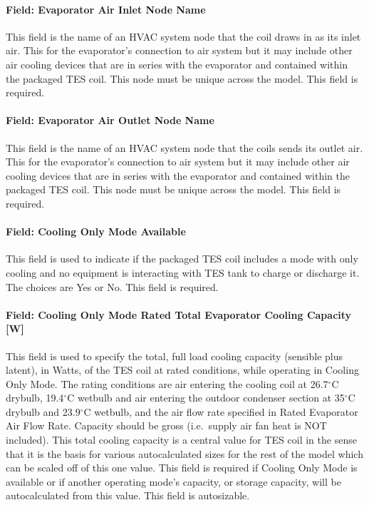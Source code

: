 \paragraph{Field: Evaporator Air Inlet Node Name}\label{field-evaporator-air-inlet-node-name-3}

This field is the name of an HVAC system node that the coil draws in as its inlet air. This for the evaporator's connection to air system but it may include other air cooling devices that are in series with the evaporator and contained within the packaged TES coil. This node must be unique across the model. This field is required.

\paragraph{Field: Evaporator Air Outlet Node Name}\label{field-evaporator-air-outlet-node-name-2}

This field is the name of an HVAC system node that the coils sends its outlet air. This for the evaporator's connection to air system but it may include other air cooling devices that are in series with the evaporator and contained within the packaged TES coil. This node must be unique across the model. This field is required.

\paragraph{Field: Cooling Only Mode Available}\label{field-cooling-only-mode-available}

This field is used to indicate if the packaged TES coil includes a mode with only cooling and no equipment is interacting with TES tank to charge or discharge it. The choices are Yes or No. This field is required.

\paragraph{Field: Cooling Only Mode Rated Total Evaporator Cooling Capacity {[}W{]}}\label{field-cooling-only-mode-rated-total-evaporator-cooling-capacity-w}

This field is used to specify the total, full load cooling capacity (sensible plus latent), in Watts, of the TES coil at rated conditions, while operating in Cooling Only Mode. The rating conditions are air entering the cooling coil at 26.7$^\circ$C drybulb, 19.4$^\circ$C wetbulb and air entering the outdoor condenser section at 35$^\circ$C drybulb and 23.9$^\circ$C wetbulb, and the air flow rate specified in Rated Evaporator Air Flow Rate. Capacity should be gross (i.e.~supply air fan heat is NOT included). This total cooling capacity is a central value for TES coil in the sense that it is the basis for various autocalculated sizes for the rest of the model which can be scaled off of this one value. This field is required if Cooling Only Mode is available or if another operating mode's capacity, or storage capacity, will be autocalculated from this value. This field is autosizable.

